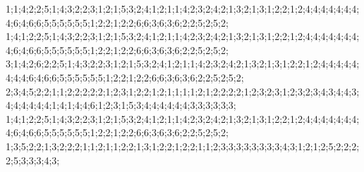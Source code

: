 1;1;4;2;2;5;1;4;3;2;2;3;1;2;1;5;3;2;4;1;2;1;1;4;2;3;2;4;2;1;3;2;1;3;1;2;2;1;2;4;4;4;4;4;4;4;4;6;4;6;6;5;5;5;5;5;5;1;2;2;1;2;2;6;6;3;6;3;6;2;2;5;2;5;2;
1;4;1;2;2;5;1;4;3;2;2;3;1;2;1;5;3;2;4;1;2;1;1;4;2;3;2;4;2;1;3;2;1;3;1;2;2;1;2;4;4;4;4;4;4;4;4;6;4;6;6;5;5;5;5;5;5;1;2;2;1;2;2;6;6;3;6;3;6;2;2;5;2;5;2;
3;1;4;2;6;2;2;5;1;4;3;2;2;3;1;2;1;5;3;2;4;1;2;1;1;4;2;3;2;4;2;1;3;2;1;3;1;2;2;1;2;4;4;4;4;4;4;4;4;6;4;6;6;5;5;5;5;5;5;1;2;2;1;2;2;6;6;3;6;3;6;2;2;5;2;5;2;
2;3;4;5;2;2;1;1;2;2;2;2;2;1;2;3;1;2;2;1;2;1;1;1;1;2;1;2;2;2;2;1;2;3;2;3;1;2;3;2;3;4;3;4;4;3;4;4;4;4;4;4;1;4;1;4;4;6;1;2;3;1;5;3;4;4;4;4;4;4;3;3;3;3;3;3;
1;4;1;2;2;5;1;4;3;2;2;3;1;2;1;5;3;2;4;1;2;1;1;4;2;3;2;4;2;1;3;2;1;3;1;2;2;1;2;4;4;4;4;4;4;4;4;6;4;6;6;5;5;5;5;5;5;1;2;2;1;2;2;6;6;3;6;3;6;2;2;5;2;5;2;
1;3;5;2;2;1;3;2;2;2;1;1;2;1;1;2;2;1;3;1;2;2;1;2;2;1;1;2;3;3;3;3;3;3;3;3;4;3;1;2;1;2;5;2;2;2;2;5;3;3;3;4;3;
